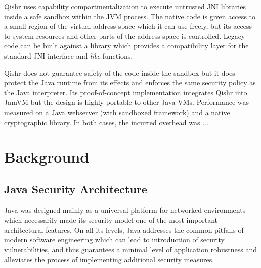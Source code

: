 \documentclass[a4paper,12pt,twoside,openright]{report}
\newcommand{\tool}[1]{\emph{#1}}
\newcommand{\lib}[1]{\tool{lib#1}}
\begin{document}
Qishr uses capability compartmentalization to execute untrusted JNI libraries inside a safe sandbox within the JVM process. The native code is given access to a small region of the virtual address space which it can use freely, but its access to system resources and other parts of the address space is controlled. Legacy code can be built against a library which provides a compatibility layer for the standard JNI interface and \lib{c} functions.

Qishr does not guarantee safety of the code inside the sandbox but it does protect the Java runtime from its effects and enforces the same security policy as the Java interpreter. Its proof-of-concept implementation integrates Qishr into JamVM but the design is highly portable to other Java VMs. Performance was measured on a Java webserver (with sandboxed framework) and a native cryptographic library. In both cases, the incurred overhead was ...

\chapter{Background} 

% 

\section{Java Security Architecture}

Java was designed mainly as a universal platform for networked environments which necessarily made its security model one of the most important architectural features. On all its levels, Java addresses the common pitfalls of modern software engineering which can lead to introduction of security vulnerabilities, and thus guarantees a minimal level of application robustness and alleviates the process of implementing additional security measures.
\end{document}

